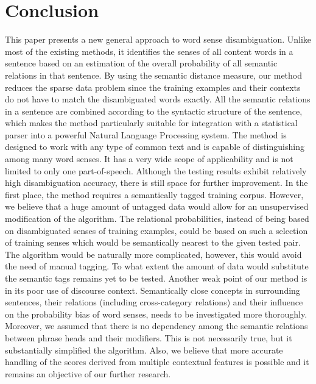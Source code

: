 \section{Conclusion}

This paper presents a new general approach to word sense disambiguation. Unlike most of the existing methods, it identifies the senses of all content words in a sentence based on an estimation of the overall probability of all semantic relations in that sentence. By using the semantic distance measure, our method reduces the sparse data problem since the training examples and their contexts do not have to match the disambiguated words exactly. All the semantic relations in a sentence are combined according to the syntactic structure of the sentence, which makes the method particularly suitable for integration with a statistical parser into a powerful Natural Language Processing system. The method is designed to work with any type of common text and is capable of distinguishing among many word senses. It has a very wide scope of applicability and is not limited to only one part-of-speech. Although the testing results exhibit relatively high disambiguation accuracy, there is still space for further improvement. In the first place, the method requires a semantically tagged training corpus. However, we believe that a huge amount of untagged data would allow for an unsupervised modification of the algorithm. The relational probabilities, instead of being based on disambiguated senses of training examples, could be based on such a selection of training senses which would be semantically nearest to the given tested pair. The algorithm would be naturally more complicated, however, this would avoid the need of manual tagging. To what extent the amount of data would substitute the semantic tags remains yet to be tested. Another weak point of our method is in its poor use of discourse context. Semantically close concepts in surrounding sentences, their relations (including cross-category relations) and their influence on the probability bias of word senses, needs to be investigated more thoroughly. Moreover, we assumed that there is no dependency among the semantic relations between phrase heads and their modifiers. This is not necessarily true, but it substantially simplified the algorithm. Also, we believe that more accurate handling of the scores derived from multiple contextual features is possible and it remains an objective of our further research.






